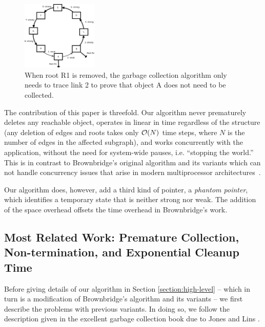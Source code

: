 \begin{figure}[!t]
\centering
\includegraphics[width=0.32\textwidth]{figs/simplecyclenew}
\caption{When root R1 is removed, the garbage collection algorithm
only needs to trace link 2 to prove that object A does not need
to be collected.}
\label{prove}
\end{figure}

The contribution of this paper is threefold. Our algorithm never prematurely deletes any reachable object, operates in linear in time regardless of the structure (any
deletion of edges and roots takes only ${\cal O}(N)$ time steps,
where $N$ is the number of edges in the
affected subgraph), and works concurrently with the application, without the need for system-wide pauses, i.e. ``stopping the world.''
This is in contrast to Brownbridge's original algorithm and its variants \cite{Brownbridge1985,Salkild1987,Pepels1988} which can not handle concurrency issues that arise in modern multiprocessor architectures~\cite{Roy:1998}.

Our algorithm does, however, add a third kind of pointer, a {\em phantom pointer}, which identifies a temporary state that is neither strong nor weak. The addition of the space overhead offsets the time overhead in Brownbridge's work.



\subsection{Most Related Work: Premature Collection, Non-termination, and Exponential Cleanup Time}
\label{section:exponential}
Before giving details of our algorithm in Section \ref{section:high-level} %
-- which in turn is a modification of Brownbridge's algorithm and its variants \cite{Brownbridge1985,Salkild1987,Pepels1988} -- we first describe the problems with previous variants. In doing so, we follow the description given in the excellent garbage collection book due to Jones and Lins \cite{Jones1996}.

